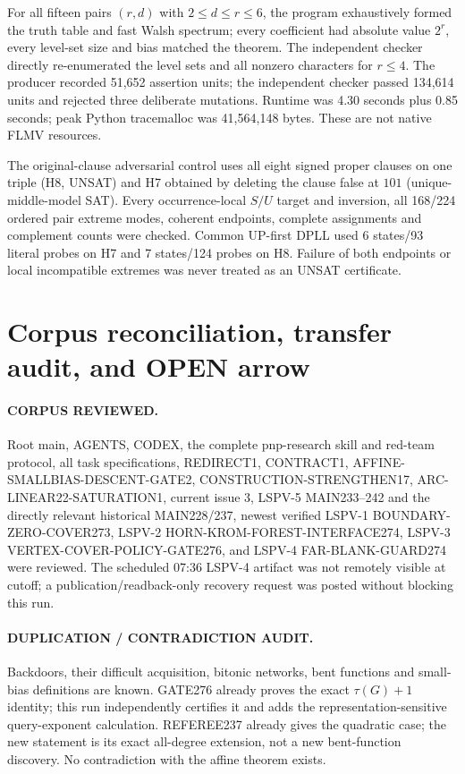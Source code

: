 \documentclass[11pt]{article}
\begin{document}
For all fifteen pairs $(r,d)$ with $2\le d\le r\le6$, the program exhaustively
formed the truth table and fast Walsh spectrum; every coefficient had absolute
value $2^r$, every level-set size and bias matched the theorem.  The independent
checker directly re-enumerated the level sets and all nonzero characters for
$r\le4$.  The producer recorded 51,652 assertion units; the independent checker
passed 134,614 units and rejected three deliberate mutations.  Runtime was
4.30 seconds plus 0.85 seconds; peak Python tracemalloc was 41,564,148 bytes.
These are not native FLMV resources.

The original-clause adversarial control uses all eight signed proper clauses on
one triple (H8, UNSAT) and H7 obtained by deleting the clause false at $101$
(unique-middle-model SAT).  Every occurrence-local $S/U$ target and inversion,
all 168/224 ordered pair extreme modes, coherent endpoints, complete assignments
and complement counts were checked.  Common UP-first DPLL used 6 states/93
literal probes on H7 and 7 states/124 probes on H8.  Failure of both endpoints
or local incompatible extremes was never treated as an UNSAT certificate.

\section{Corpus reconciliation, transfer audit, and OPEN arrow}
\paragraph{CORPUS REVIEWED.}
Root main, AGENTS, CODEX, the complete pnp-research skill and red-team protocol,
all task specifications, REDIRECT1, CONTRACT1, AFFINE-SMALLBIAS-DESCENT-GATE2,
CONSTRUCTION-STRENGTHEN17, ARC-LINEAR22-SATURATION1, current issue 3, LSPV-5
MAIN233--242 and the directly relevant historical MAIN228/237, newest verified
LSPV-1 BOUNDARY-ZERO-COVER273, LSPV-2 HORN-KROM-FOREST-INTERFACE274, LSPV-3
VERTEX-COVER-POLICY-GATE276, and LSPV-4 FAR-BLANK-GUARD274 were reviewed.
The scheduled 07:36 LSPV-4 artifact was not remotely visible at cutoff; a
publication/readback-only recovery request was posted without blocking this run.

\paragraph{DUPLICATION / CONTRADICTION AUDIT.}
Backdoors, their difficult acquisition, bitonic networks, bent functions and
small-bias definitions are known.  GATE276 already proves the exact
$\tau(G)+1$ identity; this run independently certifies it and adds the
representation-sensitive query-exponent calculation.  REFEREE237 already gives
the quadratic case; the new statement is its exact all-degree extension, not a
new bent-function discovery.  No contradiction with the affine theorem exists.
\end{document}
